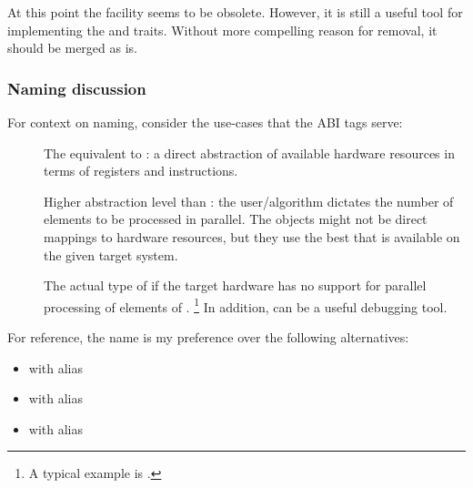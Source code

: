 At this point the \simdabi{} facility seems to be obsolete.
However, it is still a useful tool for implementing the  and  traits.
Without more compelling reason for removal, it should be merged as is.

\subsubsection{Naming discussion}

For context on naming, consider the use-cases that the ABI tags serve:

\begin{description}
  \item[\simdabi{}] The equivalent to : a direct abstraction of available hardware resources in terms of registers and instructions.

  \item[\simdabi{}] Higher abstraction level than : the user/algorithm dictates the number of elements to be processed in parallel.
    The objects might not be direct mappings to hardware resources, but they use the best that is available on the given target system.

  \item[\simdabi{}] The actual type of  if the target hardware has no support for parallel processing of elements of .%
    \footnote{A typical example is \simdabi{}.}
    In addition,  can be a useful debugging tool.
\end{description}

For reference, the name  is my preference over the following alternatives:
\begin{itemize}
  \item {} with  alias 
  \item {} with  alias 
  \item {} with  alias 
\end{itemize}

